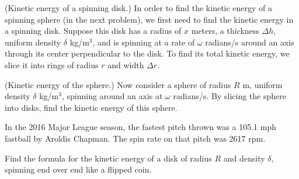 \documentclass[letterpaper,11pt]{examPTP}
\begin{document}
\begin{questions}
\question (Kinetic energy of a spinning disk.) In order to find the kinetic energy of a spinning sphere (in the next problem), we first need to find the kinetic energy in a spinning disk. Suppose this disk has a radius of $x$ meters, a thickness $\Delta h$, uniform density $\delta$ kg/m$^3$, and is spinning at a rate of $\omega$ radians/s around an axis through its center perpendicular to the disk. To find its total kinetic energy, we slice it into rings of radius $r$ and width $\Delta r$.

\question[8] (Kinetic energy of the sphere.) Now consider a sphere of radius $R$ m, uniform density $\delta$ kg/m$^3$, spinning around an axis at $\omega$ radians/s. By slicing the sphere into disks, find the kinetic energy of this sphere.

\question In the 2016 Major League season, the fastest pitch thrown was a 105.1 mph fastball by Aroldis Chapman. The spin rate on that pitch was 2617 rpm.

\question[10] Find the formula for the kinetic energy of a disk of radius $R$ and density $\delta$, spinning end over end like a flipped coin.


\end{questions}      

\vspace{0.5in}
\end{document}
